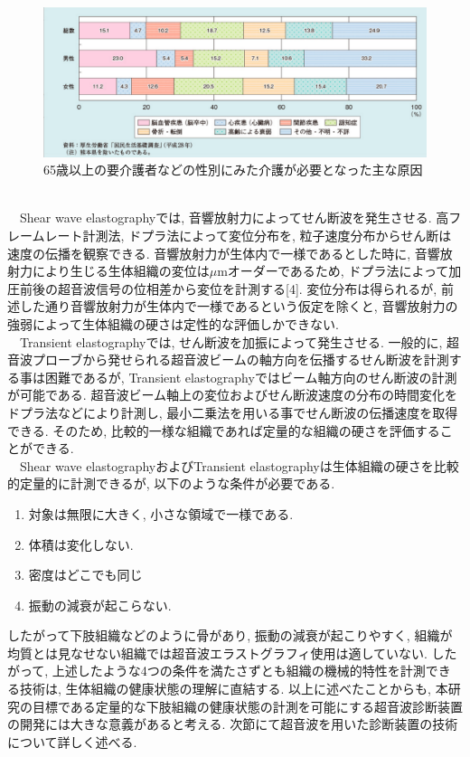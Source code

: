 \begin{figure}[h]
  \begin{center}
    \includegraphics[width=140mm]{fig/kaigo.pdf}
  \end{center}
  \caption{65歳以上の要介護者などの性別にみた介護が必要となった主な原因\cite{kaigogenin}}
\end{figure}
\\\ \ Shear wave elastographyでは, 音響放射力によってせん断波を発生させる. 高フレームレート計測法, ドプラ法によって変位分布を, 粒子速度分布からせん断は速度の伝播を観察できる. 音響放射力が生体内で一様であるとした時に, 音響放射力により生じる生体組織の変位は$\mu$mオーダーであるため, ドプラ法によって加圧前後の超音波信号の位相差から変位を計測する[4]. 変位分布は得られるが, 前述した通り音響放射力が生体内で一様であるという仮定を除くと, 音響放射力の強弱によって生体組織の硬さは定性的な評価しかできない.
\\\ \ Transient elastographyでは, せん断波を加振によって発生させる. 一般的に, 超音波プローブから発せられる超音波ビームの軸方向を伝播するせん断波を計測する事は困難であるが, Transient elastographyではビーム軸方向のせん断波の計測が可能である. 超音波ビーム軸上の変位およびせん断波速度の分布の時間変化をドプラ法などにより計測し, 最小二乗法を用いる事でせん断波の伝播速度を取得できる. そのため, 比較的一様な組織であれば定量的な組織の硬さを評価することができる. 
\\\ \ Shear wave elastographyおよびTransient elastographyは生体組織の硬さを比較的定量的に計測できるが, 以下のような条件が必要である\cite{elastography}.
\begin{enumerate}
   \item 対象は無限に大きく, 小さな領域で一様である.
   \item 体積は変化しない. 
   \item 密度はどこでも同じ
   \item 振動の減衰が起こらない. 
\end{enumerate}
したがって下肢組織などのように骨があり, 振動の減衰が起こりやすく, 組織が均質とは見なせない組織では超音波エラストグラフィ使用は適していない. したがって, 上述したような4つの条件を満たさずとも組織の機械的特性を計測できる技術は, 生体組織の健康状態の理解に直結する. 以上に述べたことからも, 本研究の目標である定量的な下肢組織の健康状態の計測を可能にする超音波診断装置の開発には大きな意義があると考える. 次節にて超音波を用いた診断装置の技術について詳しく述べる. 

